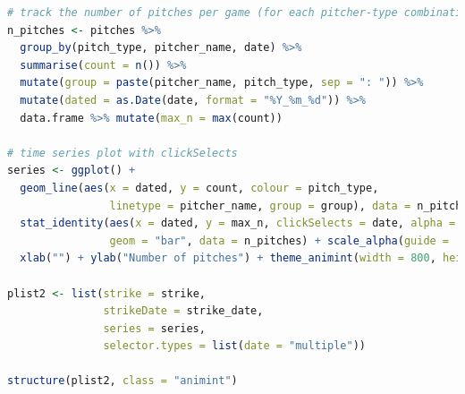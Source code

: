 \documentclass[12pt]{article}
\numberwithin{equation}{subsection}
\begin{document}
\begin{lstlisting}[language=R, caption=Github R snippets]
# track the number of pitches per game (for each pitcher-type combination)
n_pitches <- pitches %>%
  group_by(pitch_type, pitcher_name, date) %>%
  summarise(count = n()) %>% 
  mutate(group = paste(pitcher_name, pitch_type, sep = ": ")) %>%
  mutate(dated = as.Date(date, format = "%Y_%m_%d")) %>%
  data.frame %>% mutate(max_n = max(count))

# time series plot with clickSelects
series <- ggplot() + 
  geom_line(aes(x = dated, y = count, colour = pitch_type, 
                linetype = pitcher_name, group = group), data = n_pitches) + 
  stat_identity(aes(x = dated, y = max_n, clickSelects = date, alpha = 0.2), 
                geom = "bar", data = n_pitches) + scale_alpha(guide = 'none') +
  xlab("") + ylab("Number of pitches") + theme_animint(width = 800, height = 200)

plist2 <- list(strike = strike,
               strikeDate = strike_date,
               series = series,
               selector.types = list(date = "multiple"))

structure(plist2, class = "animint")
\end{lstlisting}
\bigskip
{}
\end{document}
